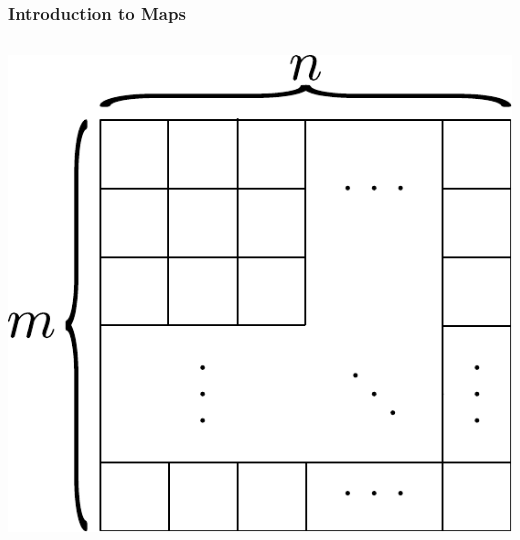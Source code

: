 \documentclass{beamer}
\begin{document}
\begin{frame}
\frametitle{Introduction to Maps}

\begin{columns}[c]
\includegraphics[height=.8\textheight]{sam_images/general-map.pdf}
\end{columns}

\end{frame}
\end{document}
